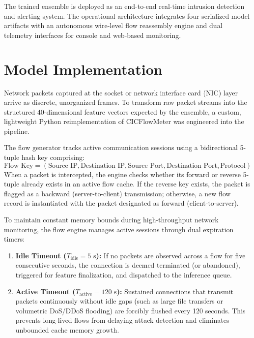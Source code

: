 \documentclass[12pt,a4paper]{report}
\begin{document}
The trained ensemble is deployed as an end-to-end real-time intrusion detection and alerting system. The operational architecture integrates four serialized model artifacts with an autonomous wire-level flow reassembly engine and dual telemetry interfaces for console and web-based monitoring.

\section{Model Implementation}

Network packets captured at the socket or network interface card (NIC) layer arrive as discrete, unorganized frames. To transform raw packet streams into the structured 40-dimensional feature vectors expected by the ensemble, a custom, lightweight Python reimplementation of CICFlowMeter was engineered into the pipeline.

The flow generator tracks active communication sessions using a bidirectional 5-tuple hash key comprising:
\begin{equation}
\text{Flow Key} = \left(\text{Source IP}, \text{Destination IP}, \text{Source Port}, \text{Destination Port}, \text{Protocol}\right)
\end{equation}
When a packet is intercepted, the engine checks whether its forward or reverse 5-tuple already exists in an active flow cache. If the reverse key exists, the packet is flagged as a backward (server-to-client) transmission; otherwise, a new flow record is instantiated with the packet designated as forward (client-to-server).

To maintain constant memory bounds during high-throughput network monitoring, the flow engine manages active sessions through dual expiration timers:
\begin{enumerate}
    \item \textbf{Idle Timeout ($T_{\text{idle}} = 5\text{ s}$):} If no packets are observed across a flow for five consecutive seconds, the connection is deemed terminated (or abandoned), triggered for feature finalization, and dispatched to the inference queue.
    \item \textbf{Active Timeout ($T_{\text{active}} = 120\text{ s}$):} Sustained connections that transmit packets continuously without idle gaps (such as large file transfers or volumetric DoS/DDoS flooding) are forcibly flushed every 120 seconds. This prevents long-lived flows from delaying attack detection and eliminates unbounded cache memory growth.
\end{enumerate}
\end{document}
